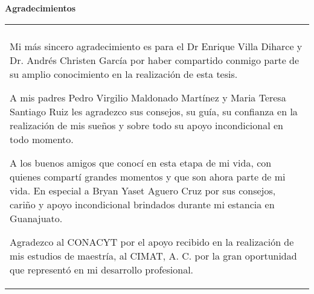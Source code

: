 


\noindent \mbox{{\huge \textbf{Agradecimientos}}}
\vspace{2cm}




\noindent
\begin{tabular}{p{13.2cm}}


\hline \hline

\\[0.3cm]
Mi m\'as sincero agradecimiento es para el Dr Enrique Villa Diharce y Dr. Andr\'es Christen Garc\'ia por haber compartido conmigo parte de su amplio
conocimiento en la realizaci\'on de esta tesis. 
\medskip


\indent A mis padres Pedro Virgilio Maldonado Mart\'inez  y Maria Teresa Santiago Ruiz les agradezco sus consejos, su
gu\'ia, su confianza en la realizaci\'on de mis sue\~nos y sobre todo su apoyo incondicional en todo momento. 
\medskip

\medskip
\indent A los buenos amigos que conoc\'i en esta etapa de mi vida, con quienes compart\'i grandes momentos y que son ahora parte de mi vida. En especial a Bryan Yaset Aguero Cruz por sus consejos, cari\~no y apoyo incondicional brindados durante mi estancia en Guanajuato.
\medskip

\indent Agradezco al CONACYT por el apoyo recibido en la realizaci\'on de mis estudios de maestr\'ia, al CIMAT, A. C. por la gran oportunidad que represent\'o en mi desarrollo profesional.
\end{tabular}


\newpage \thispagestyle{empty} \cleardoublepage
